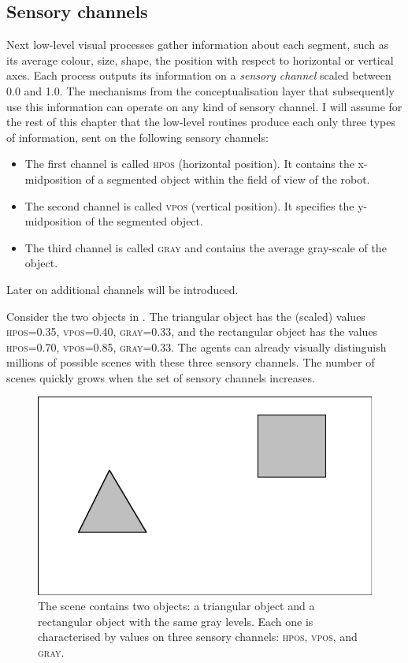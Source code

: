 \subsection{Sensory channels}

Next low-level visual processes gather information about each 
segment, such as its average colour, size, shape,
the position with respect to horizontal or vertical axes. 
Each process outputs its information on a {\itshape sensory 
channel} scaled between 0.0 and 1.0. The mechanisms from 
the conceptualisation layer that subsequently use this information
can operate on any kind of sensory channel. 
I will assume for the rest of this chapter that the low-level
routines produce each only three types of information, sent
on the following sensory channels: 
\begin{itemize}
\item The first channel is called \textsc{hpos} (horizontal position). 
It contains the x-midpos\-ition of a segmented object within
the field of view of the robot. 
\item The second channel is called \textsc{vpos} (vertical position). It
specifies the y-midpos\-ition of the segmented object. 
\item The third channel is called \textsc{gray} and contains 
the average gray-scale of the object. 
\end{itemize}
Later on additional channels will be introduced. 

Consider the two objects in . The triangular
object has the (scaled) values \textsc{hpos}=0.35, \textsc{vpos}=0.40, \textsc{gray}=0.33, and 
the rectangular object has the values \textsc{hpos}=0.70, \textsc{vpos}=0.85, 
\textsc{gray}=0.33. The agents can already visually distinguish
millions of possible scenes with these three sensory
channels. The number of scenes
quickly grows when the set of sensory channels increases. 

\begin{figure}[b]
  \centerline{\includegraphics[width=.50\textwidth]{chap2/figs/scene1-1.pdf}}
\caption{\label{scene1-1}The scene contains two 
objects: a triangular object and a rectangular object
with the same gray levels. 
Each one is characterised by values on three sensory 
channels: \textsc{hpos}, \textsc{vpos}, and \textsc{gray}.}
\end{figure}

